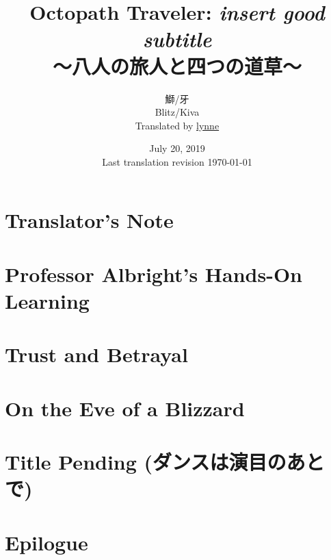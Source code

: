 \documentclass[a4paper,11pt]{memoir}
\title{%
Octopath Traveler: \emph{insert good subtitle} \\
\large{～八人の旅人と四つの道草～}
}
\author{%
鰤/牙 \\
Blitz/Kiva \\
Translated by \href{https://twitter.com/plvpwaa}{lynne}
}
\date{%
July 20, 2019 \\
Last translation revision \today
}
\begin{document}
	\maketitle
	\pagebreak
	\tableofcontents*
	\frontmatter
	\chapter{Translator's Note}
		
	\mainmatter
	\chapter{Professor Albright's Hands-On Learning}
		
	\chapter{Trust and Betrayal}
	\chapter{On the Eve of a Blizzard}
	\chapter{Title Pending (ダンスは演目のあとで)}
	\chapter{Epilogue}
\end{document}
